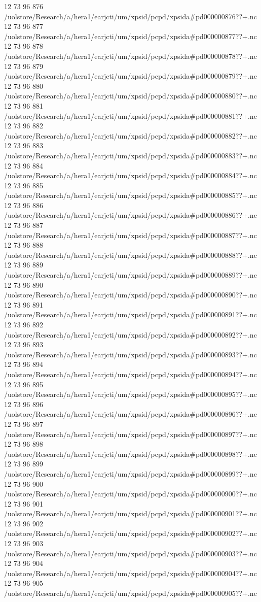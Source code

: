 12 73 96
876
/uolstore/Research/a/hera1/earjcti/um/xpsid/pcpd/xpsida#pd000000876??+.nc
12 73 96
877
/uolstore/Research/a/hera1/earjcti/um/xpsid/pcpd/xpsida#pd000000877??+.nc
12 73 96
878
/uolstore/Research/a/hera1/earjcti/um/xpsid/pcpd/xpsida#pd000000878??+.nc
12 73 96
879
/uolstore/Research/a/hera1/earjcti/um/xpsid/pcpd/xpsida#pd000000879??+.nc
12 73 96
880
/uolstore/Research/a/hera1/earjcti/um/xpsid/pcpd/xpsida#pd000000880??+.nc
12 73 96
881
/uolstore/Research/a/hera1/earjcti/um/xpsid/pcpd/xpsida#pd000000881??+.nc
12 73 96
882
/uolstore/Research/a/hera1/earjcti/um/xpsid/pcpd/xpsida#pd000000882??+.nc
12 73 96
883
/uolstore/Research/a/hera1/earjcti/um/xpsid/pcpd/xpsida#pd000000883??+.nc
12 73 96
884
/uolstore/Research/a/hera1/earjcti/um/xpsid/pcpd/xpsida#pd000000884??+.nc
12 73 96
885
/uolstore/Research/a/hera1/earjcti/um/xpsid/pcpd/xpsida#pd000000885??+.nc
12 73 96
886
/uolstore/Research/a/hera1/earjcti/um/xpsid/pcpd/xpsida#pd000000886??+.nc
12 73 96
887
/uolstore/Research/a/hera1/earjcti/um/xpsid/pcpd/xpsida#pd000000887??+.nc
12 73 96
888
/uolstore/Research/a/hera1/earjcti/um/xpsid/pcpd/xpsida#pd000000888??+.nc
12 73 96
889
/uolstore/Research/a/hera1/earjcti/um/xpsid/pcpd/xpsida#pd000000889??+.nc
12 73 96
890
/uolstore/Research/a/hera1/earjcti/um/xpsid/pcpd/xpsida#pd000000890??+.nc
12 73 96
891
/uolstore/Research/a/hera1/earjcti/um/xpsid/pcpd/xpsida#pd000000891??+.nc
12 73 96
892
/uolstore/Research/a/hera1/earjcti/um/xpsid/pcpd/xpsida#pd000000892??+.nc
12 73 96
893
/uolstore/Research/a/hera1/earjcti/um/xpsid/pcpd/xpsida#pd000000893??+.nc
12 73 96
894
/uolstore/Research/a/hera1/earjcti/um/xpsid/pcpd/xpsida#pd000000894??+.nc
12 73 96
895
/uolstore/Research/a/hera1/earjcti/um/xpsid/pcpd/xpsida#pd000000895??+.nc
12 73 96
896
/uolstore/Research/a/hera1/earjcti/um/xpsid/pcpd/xpsida#pd000000896??+.nc
12 73 96
897
/uolstore/Research/a/hera1/earjcti/um/xpsid/pcpd/xpsida#pd000000897??+.nc
12 73 96
898
/uolstore/Research/a/hera1/earjcti/um/xpsid/pcpd/xpsida#pd000000898??+.nc
12 73 96
899
/uolstore/Research/a/hera1/earjcti/um/xpsid/pcpd/xpsida#pd000000899??+.nc
12 73 96
900
/uolstore/Research/a/hera1/earjcti/um/xpsid/pcpd/xpsida#pd000000900??+.nc
12 73 96
901
/uolstore/Research/a/hera1/earjcti/um/xpsid/pcpd/xpsida#pd000000901??+.nc
12 73 96
902
/uolstore/Research/a/hera1/earjcti/um/xpsid/pcpd/xpsida#pd000000902??+.nc
12 73 96
903
/uolstore/Research/a/hera1/earjcti/um/xpsid/pcpd/xpsida#pd000000903??+.nc
12 73 96
904
/uolstore/Research/a/hera1/earjcti/um/xpsid/pcpd/xpsida#pd000000904??+.nc
12 73 96
905
/uolstore/Research/a/hera1/earjcti/um/xpsid/pcpd/xpsida#pd000000905??+.nc
